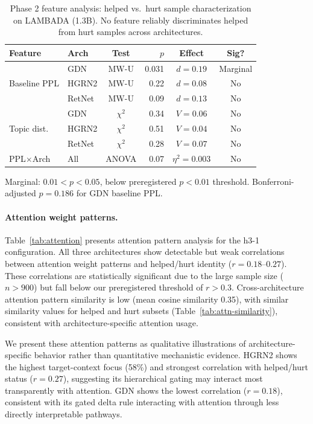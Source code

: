 \documentclass[11pt,a4paper]{article}
\begin{document}
\begin{table}[t]
\centering
\small
\caption{Phase 2 feature analysis: helped vs.\ hurt sample characterization on LAMBADA (1.3B). No feature reliably discriminates helped from hurt samples across architectures.}
\label{tab:phase2}
\begin{tabular}{@{}llcrcc@{}}
\toprule
Feature & Arch & Test & $p$ & Effect & Sig? \\
\midrule
\multirow{3}{*}{Baseline PPL} & GDN & MW-U & 0.031 & $d{=}0.19$ & Marginal \\
 & HGRN2 & MW-U & 0.22 & $d{=}0.08$ & No \\
 & RetNet & MW-U & 0.09 & $d{=}0.13$ & No \\
\midrule
\multirow{3}{*}{Topic dist.} & GDN & $\chi^2$ & 0.34 & $V{=}0.06$ & No \\
 & HGRN2 & $\chi^2$ & 0.51 & $V{=}0.04$ & No \\
 & RetNet & $\chi^2$ & 0.28 & $V{=}0.07$ & No \\
\midrule
PPL$\times$Arch & All & ANOVA & 0.07 & $\eta^2{=}0.003$ & No \\
\bottomrule
\end{tabular}

\vspace{2pt}
{\footnotesize Marginal: $0.01 < p < 0.05$, below preregistered $p{<}0.01$ threshold. Bonferroni-adjusted $p{=}0.186$ for GDN baseline PPL.}
\end{table}

\paragraph{Attention weight patterns.}
Table~\ref{tab:attention} presents attention pattern analysis for the h3-1 configuration. All three architectures show detectable but weak correlations between attention weight patterns and helped/hurt identity ($r{=}0.18$--$0.27$). These correlations are statistically significant due to the large sample size ($n{>}900$) but fall below our preregistered threshold of $r{>}0.3$. Cross-architecture attention pattern similarity is low (mean cosine similarity 0.35), with similar similarity values for helped and hurt subsets (Table~\ref{tab:attn-similarity}), consistent with architecture-specific attention usage.

We present these attention patterns as qualitative illustrations of architecture-specific behavior rather than quantitative mechanistic evidence. HGRN2 shows the highest target-context focus (58\%) and strongest correlation with helped/hurt status ($r{=}0.27$), suggesting its hierarchical gating may interact most transparently with attention. GDN shows the lowest correlation ($r{=}0.18$), consistent with its gated delta rule interacting with attention through less directly interpretable pathways.
\end{document}
